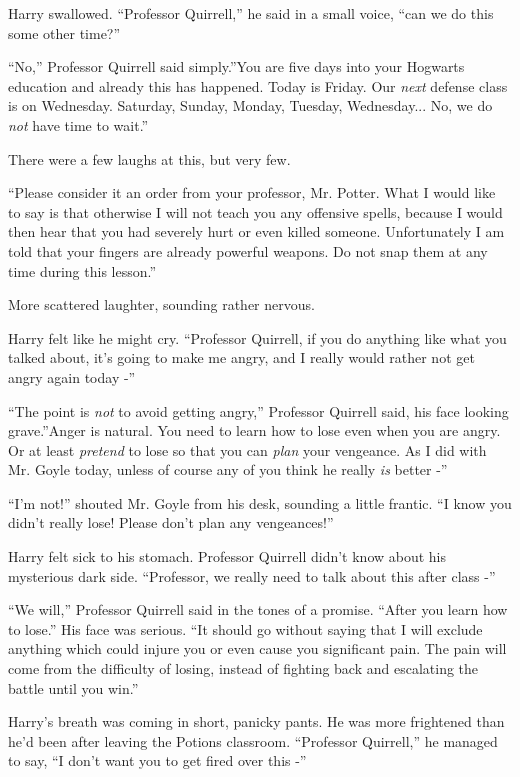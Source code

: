 Harry swallowed. ``Professor Quirrell,'' he said in a small voice, ``can
we do this some other time?''

``No,'' Professor Quirrell said simply.''You are five days into your
Hogwarts education and already this has happened. Today is Friday. Our
\emph{next} defense class is on Wednesday. Saturday, Sunday, Monday,
Tuesday, Wednesday... No, we do \emph{not} have time to wait.''

There were a few laughs at this, but very few.

``Please consider it an order from your professor, Mr. Potter. What I
would like to say is that otherwise I will not teach you any offensive
spells, because I would then hear that you had severely hurt or even
killed someone. Unfortunately I am told that your fingers are already
powerful weapons. Do not snap them at any time during this lesson.''

More scattered laughter, sounding rather nervous.

Harry felt like he might cry. ``Professor Quirrell, if you do anything
like what you talked about, it's going to make me angry, and I really
would rather not get angry again today -''

``The point is \emph{not} to avoid getting angry,'' Professor Quirrell
said, his face looking grave.''Anger is natural. You need to learn how
to lose even when you are angry. Or at least \emph{pretend} to lose so
that you can \emph{plan} your vengeance. As I did with Mr. Goyle today,
unless of course any of you think he really \emph{is} better -''

``I'm not!'' shouted Mr. Goyle from his desk, sounding a little frantic.
``I know you didn't really lose! Please don't plan any vengeances!''

Harry felt sick to his stomach. Professor Quirrell didn't know about his
mysterious dark side. ``Professor, we really need to talk about this
after class -''

``We will,'' Professor Quirrell said in the tones of a promise. ``After
you learn how to lose.'' His face was serious. ``It should go without
saying that I will exclude anything which could injure you or even cause
you significant pain. The pain will come from the difficulty of losing,
instead of fighting back and escalating the battle until you win.''

Harry's breath was coming in short, panicky pants. He was more
frightened than he'd been after leaving the Potions classroom.
``Professor Quirrell,'' he managed to say, ``I don't want you to get
fired over this -''


